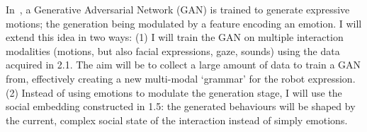 In~\parencite{suguitan2020moveae}, a Generative Adversarial Network (GAN) is
trained to generate expressive motions; the generation being modulated by a
feature encoding an emotion. I will extend this idea in two ways: (1) I will
train the GAN on multiple interaction modalities (motions, but also facial
expressions, gaze, sounds) using the data acquired in 2.1. The aim will be to collect a
large amount of data to train a GAN from, effectively creating a new
multi-modal `grammar' for the robot expression.  (2) Instead of using emotions
to modulate the generation stage, I will use the social embedding constructed in
1.5: the generated behaviours will be shaped by the current, complex social
state of the interaction instead of simply emotions.
%
%
%
%
%
%
%
